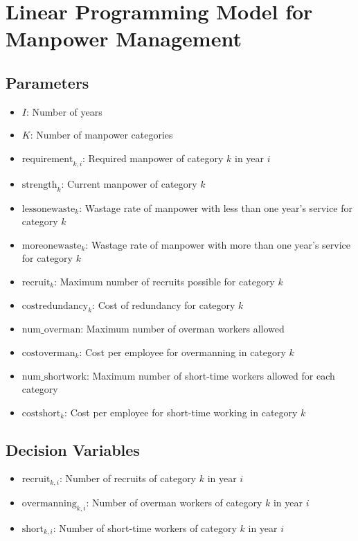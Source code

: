 \documentclass{article}
\begin{document}
\section*{Linear Programming Model for Manpower Management}

\subsection*{Parameters}
\begin{itemize}
    \item \( I \): Number of years
    \item \( K \): Number of manpower categories
    \item \( \text{requirement}_{k, i} \): Required manpower of category \( k \) in year \( i \)
    \item \( \text{strength}_{k} \): Current manpower of category \( k \)
    \item \( \text{lessonewaste}_{k} \): Wastage rate of manpower with less than one year's service for category \( k \)
    \item \( \text{moreonewaste}_{k} \): Wastage rate of manpower with more than one year's service for category \( k \)
    \item \( \text{recruit}_{k} \): Maximum number of recruits possible for category \( k \)
    \item \( \text{costredundancy}_{k} \): Cost of redundancy for category \( k \)
    \item \( \text{num\_overman} \): Maximum number of overman workers allowed
    \item \( \text{costoverman}_{k} \): Cost per employee for overmanning in category \( k \)
    \item \( \text{num\_shortwork} \): Maximum number of short-time workers allowed for each category
    \item \( \text{costshort}_{k} \): Cost per employee for short-time working in category \( k \)
\end{itemize}

\subsection*{Decision Variables}
\begin{itemize}
    \item \( \text{recruit}_{k, i} \): Number of recruits of category \( k \) in year \( i \)
    \item \( \text{overmanning}_{k, i} \): Number of overman workers of category \( k \) in year \( i \)
    \item \( \text{short}_{k, i} \): Number of short-time workers of category \( k \) in year \( i \)
\end{itemize}
\end{document}
